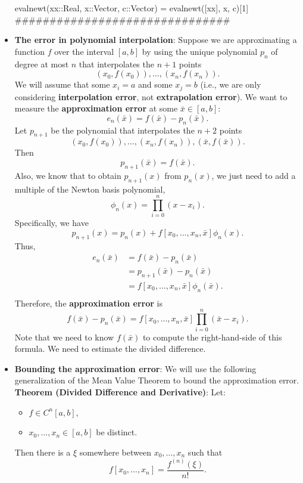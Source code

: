 \documentclass{report}
\begin{document}
\begin{itemize}
\begin{cppcode}
evalnewt(xx::Real, x::Vector, c::Vector) = evalnewt([xx], x, c)[1]
###############################
    \end{cppcode}
\item \textbf{The error in polynomial interpolation}:
    Suppose we are approximating a function $f$ over the interval $[a,b]$ by using the unique polynomial $p_n$ of degree at most $n$ that interpolates the $n+1$ points
    $$(x_0,f(x_0)), \ldots, (x_n,f(x_n)).$$
    We will assume that some $x_i = a$ and some $x_j = b$ (i.e., we are only considering \textbf{interpolation error}, not \textbf{extrapolation error}).
    \bigbreak \noindent 
    We want to measure the \textbf{approximation error} at some $\bar x \in [a,b]$:
    $$e_n(\bar x) = f(\bar x) - p_n(\bar x).$$
    \bigbreak \noindent 
    Let $p_{n+1}$ be the polynomial that interpolates the $n+2$ points
    $$(x_0,f(x_0)), \ldots, (x_n,f(x_n)), (\bar x,f(\bar x)).$$
    \bigbreak \noindent 
    Then
    $$p_{n+1}(\bar x) = f(\bar x).$$
    Also, we know that to obtain $p_{n+1}(x)$ from $p_n(x)$, we just need to add a multiple of the Newton basis polynomial,
    $$\phi_n(x) = \prod_{i=0}^n (x - x_i).$$
    Specifically, we have
    $$p_{n+1}(x) = p_n(x) + f[x_0,\ldots,x_n,\bar x] \phi_n(x).$$
    \bigbreak \noindent 
    Thus, 
    $$
    \begin{align}
        e_n(\bar x) 
& = f(\bar x) - p_n(\bar x) \\
& = p_{n+1}(\bar x) - p_n(\bar x) \\
& = f[x_0,\ldots,x_n,\bar x] \phi_n(\bar x).\\
    \end{align}
    $$
    Therefore, the \textbf{approximation error} is
    $$f(\bar x) - p_n(\bar x) = f[x_0,\ldots,x_n,\bar x] \prod_{i=0}^n (\bar x-x_i).$$
    Note that we need to know $f(\bar x)$ to compute the right-hand-side of this formula. We need to estimate the divided difference.
\item \textbf{Bounding the approximation error}:
    We will use the following generalization of the Mean Value Theorem to bound the approximation error.
    \bigbreak \noindent 
    \textbf{Theorem (Divided Difference and Derivative)}:
    Let:
    \begin{itemize}
        \item $f \in C^n[a,b]$,
        \item $x_0,\ldots,x_n \in [a,b]$ be distinct. 
    \end{itemize}
    Then there is a $\xi$ somewhere between $x_0,\ldots,x_n$ such that
    $$ f[x_0,\ldots,x_n] = \frac{f^{(n)}(\xi)}{n!}. $$

\end{itemize}
\end{document}
